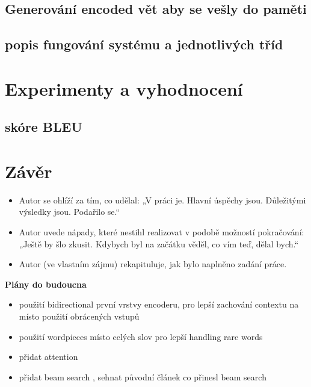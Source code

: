 \section{Generování encoded vět aby se vešly do paměti}

\section{popis fungování systému a jednotlivých tříd}

\chapter{Experimenty a vyhodnocení}
\section{skóre BLEU}



\chapter{Závěr}
\begin{itemize}
  \item Autor se ohlíží za tím, co udělal: „V práci je. Hlavní úspěchy jsou. Důležitými výsledky jsou. Podařilo se.“
  \item Autor uvede nápady, které nestihl realizovat v podobě možností pokračování: „Ještě by šlo zkusit. Kdybych byl na začátku věděl, co vím teď, dělal bych.“
  \item Autor (ve vlastním zájmu) rekapituluje, jak bylo naplněno zadání práce.
\end{itemize}

\textbf{Plány do budoucna}
\begin{itemize}
    \item použití bidirectional první vrstvy encoderu, pro lepší zachování contextu \cite{googleBridgingGap} na místo použití obrácených vstupů
    \item použití wordpieces \cite{googleBridgingGap} místo celých slov pro lepší handling rare words
    \item přidat attention \cite{attention}
    \item přidat beam search \cite{nmtTutorial}, sehnat původní článek co přinesl beam search
\end{itemize}
